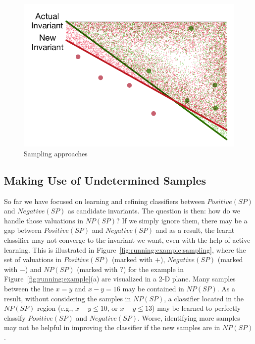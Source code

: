 \begin{figure}[t]
        \centering
        \includegraphics[scale=0.3]{figures/general-sampling-3.pdf}
    \caption{Sampling approaches}
    \label{fig:sampling}
\end{figure}

\subsection{Making Use of Undetermined Samples} \label{alternative}
So far we have focused on learning and refining classifiers between $Positive(SP)$ and $Negative(SP)$ as candidate invariants. The question is then: how do we handle those valuations in $NP(SP)$? If we simply ignore them, there may be a gap between $Positive(SP)$ and $Negative(SP)$ and as a result, the learnt classifier may not converge to the invariant we want, even with the help of active learning.
This is illustrated in Figure~\ref{fig:running:example:sampling}, where the set of valuations in $Positive(SP)$ (marked with $+$), $Negative(SP)$ (marked with $-$) and $NP(SP)$ (marked with $?$) for the example in Figure~\ref{fig:running:example}(a) are visualized in a 2-D plane. Many samples between the line $x=y$ and $x-y=16$ may be contained in $NP(SP)$. As a result, without considering the samples in $NP(SP)$, a classifier located in the $NP(SP)$ region (e.g., $x - y \leq 10$, or $x - y \leq 13$) may be learned to perfectly classify $Positive(SP)$ and $Negative(SP)$. Worse, identifying more samples may not be helpful in improving the classifier if the new samples are in $NP(SP)$.

